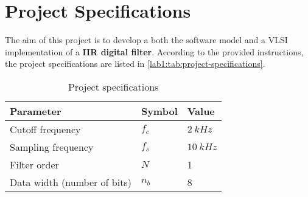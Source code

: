 \section{Project Specifications}
The aim of this project is to develop a both the software model and a VLSI implementation of a \textbf{IIR digital filter}. According to the provided instructions, the project specifications are listed in \autoref{lab1:tab:project-specifications}.
\begin{table}[htbp]
	\center
	\begin{tabular}{|l l l|}
		\hline
        \textbf{Parameter} & \textbf{Symbol} & \textbf{Value} \\ \hline
        Cutoff frequency & $f_c$ & $\SI{2}{kHz}$ \\ \hline
        Sampling frequency & $f_s$ & $\SI{10}{kHz}$ \\ \hline
        Filter order & $N$ & 1 \\ \hline
        Data width (number of bits) & $n_b$ & 8 \\
		\hline
	\end{tabular}
	\caption{Project specifications}
	\label{lab1:tab:project-specifications}
\end{table}

